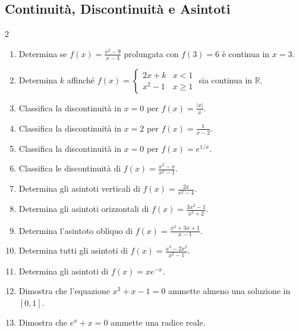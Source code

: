 \subsection{Continuità, Discontinuità e Asintoti}
\begin{multicols}{2}
\begin{enumerate}
    \item {} Determina se $f(x) = \frac{x^2-9}{x-3}$ prolungata con $f(3)=6$ è continua in $x=3$.
    \item {} Determina $k$ affinché $f(x) = \begin{cases} 2x+k & x < 1 \\ x^2-1 & x \ge 1 \end{cases}$ sia continua in $\mathbb{R}$.
    \item {} Classifica la discontinuità in $x=0$ per $f(x) = \frac{|x|}{x}$.
    \item {} Classifica la discontinuità in $x=2$ per $f(x) = \frac{1}{x-2}$.
    \item {} Classifica la discontinuità in $x=0$ per $f(x) = e^{1/x}$.
    \item {} Classifica le discontinuità di $f(x) = \frac{x^2-x}{x^2-1}$.
    \item {} Determina gli asintoti verticali di $f(x) = \frac{2x}{x^2-4}$.
    \item {} Determina gli asintoti orizzontali di $f(x) = \frac{3x^2-1}{x^2+2}$.
    \item {} Determina l'asintoto obliquo di $f(x) = \frac{x^2+3x+1}{x-1}$.
    \item {} Determina tutti gli asintoti di $f(x) = \frac{x^3 - 2x^2}{x^2 - 1}$.
    \item {} Determina gli asintoti di $f(x) = x e^{-x}$.
    \item {} Dimostra che l'equazione $x^3 + x - 1 = 0$ ammette almeno una soluzione in $[0, 1]$.
    \item {} Dimostra che $e^x + x = 0$ ammette una radice reale.
\end{enumerate}
\end{multicols}

